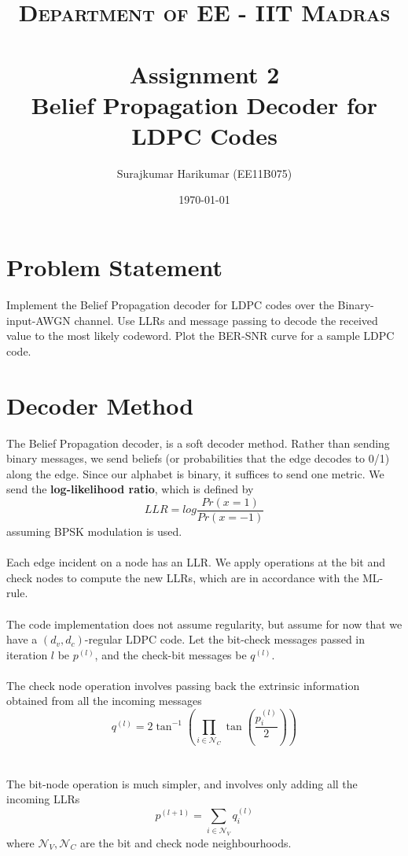 \documentclass[paper=a4, fontsize=12pt]{scrartcl} %
\title{	
\normalfont \normalsize 
\textsc{Department of EE - IIT Madras} \\ [25pt] %
\horrule{0.5pt} \\[0.4cm] %
\huge Assignment 2 \\Belief Propagation Decoder for LDPC Codes %
\horrule{2pt} \\[0.5cm] %
}
\author{Surajkumar Harikumar (EE11B075)} %
\date{\normalsize\today} %
\numberwithin{equation}{section} %
\numberwithin{figure}{section} %
\numberwithin{table}{section} %
\begin{document}
\maketitle %


\section{Problem Statement}

Implement the Belief Propagation decoder for LDPC codes over the Binary-input-AWGN channel. Use LLRs and message passing to decode the received value to the most likely codeword. Plot the BER-SNR curve for a sample LDPC code. 

\section{Decoder Method}

The Belief Propagation decoder, is a soft decoder method. Rather than sending binary messages, we send beliefs (or probabilities that the edge decodes to 0/1) along the edge. Since our alphabet is binary, it suffices to send one metric. We send the \textbf{log-likelihood ratio}, which is defined by 
\begin{equation}
  LLR = log \frac{Pr(x=1)}{Pr(x=-1)}
  \end{equation}  
assuming BPSK modulation is used. 
\\ \\
Each edge incident on a node has an LLR. We apply operations at the bit and check nodes to compute the new LLRs, which are in accordance with the ML-rule. 
\\ \\
The code implementation does not assume regularity, but assume for now that we have a $(d_v,d_c)$-regular LDPC code. Let the bit-check messages passed in iteration $l$ be $p^{(l)}$, and the check-bit messages be $q^{(l)}$. 
\\ \\
The check node operation involves passing back the extrinsic information obtained from all the incoming messages
\begin{equation}
q^{(l)} = 2 \tan^{-1} \left( \prod_{i \in \mathcal{N}_C} \tan\left(\frac{p^{(l)}_i}{2}\right) \right)
\end{equation}
\\ \\
The bit-node operation is much simpler, and involves only adding all the incoming LLRs
\begin{equation}
p^{(l+1)} = \sum_{i \in \mathcal{N}_V} q^{(l)}_i
\end{equation}
where $\mathcal{N}_V,\mathcal{N}_C$ are the bit and check node neighbourhoods. 
\end{document}
